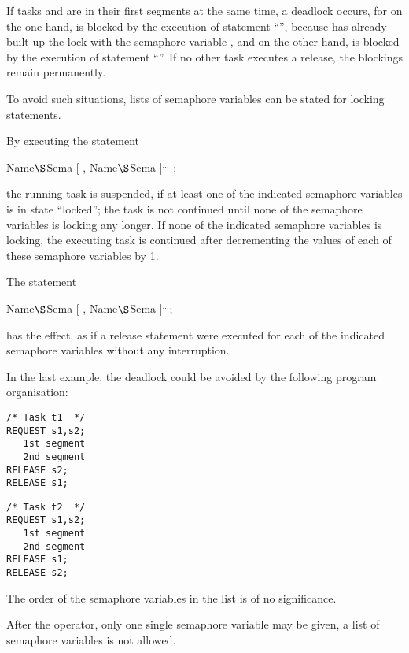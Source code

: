 If tasks  and  are in their first segments at the same time, a
deadlock occurs, for on the one hand,  is blocked by the execution of
statement ``'', because  has already built up the lock
with the semaphore variable , and on the other hand,  is blocked by
the execution of statement ``''. If no other task executes
a release, the blockings remain permanently.

To avoid such situations, lists of semaphore variables can be stated for
locking statements.

By executing the statement

 Name$\S $Sema [ , Name$\S $Sema ]$^{...}$ ;

the running task is suspended, if at least one of the indicated semaphore
variables is in state ``locked''; the task is not continued until none
of the semaphore variables is locking any longer. If none of the
indicated semaphore variables is locking, the executing task is
continued after decrementing the values of each of these semaphore variables by 1.

The statement

 Name$\S $Sema [ , Name$\S $Sema ]$^{...}$;

has the effect, as if a release statement were executed for each of
the indicated semaphore variables without any interruption.

In the last example, the deadlock could be avoided by the following
program organisation:

\begin{multicols}{2}
\begin{lstlisting}
/* Task t1  */
REQUEST s1,s2; 
   1st segment 
   2nd segment 
RELEASE s2; 
RELEASE s1;
\end{lstlisting}
\columnbreak
\begin{lstlisting}
/* Task t2  */
REQUEST s1,s2; 
   1st segment 
   2nd segment 
RELEASE s1; 
RELEASE s2;
\end{lstlisting}
\end{multicols}

The order of the semaphore variables in the list is of no significance.

After the  operator, only one single semaphore variable may be
given, a list of semaphore variables is not allowed.


